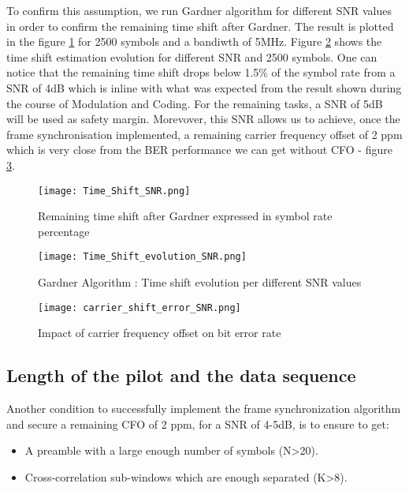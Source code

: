 To confirm this assumption, we run Gardner algorithm for different SNR values in order to confirm the remaining time shift after
Gardner.  The result is plotted in the figure \ref{Time_Shift_SNR} for 2500 symbols and a bandiwth of 5MHz.
Figure \ref{Time_Shift_evolution_SNR} shows the time shift estimation evolution for different SNR and 2500 symbols. 
 One can notice that the remaining time shift drops below 1.5\% of the symbol rate from a SNR of 4dB which is inline with what 
 was expected from the result shown during the course of Modulation and Coding.  For the remaining tasks, a SNR of 5dB will be 
 used as safety margin.
Morevover, this SNR allows us to achieve, once the frame synchronisation implemented, a remaining carrier frequency offset
of 2 ppm which is very close from the BER performance we can get without CFO - figure \ref{fig:carrier_shift_error_SNR}.

\begin{figure}[H]
    \centering
    \texttt{[image: Time\_Shift\_SNR.png]}
    \caption{Remaining time shift after Gardner expressed in symbol rate percentage}
    \label{Time_Shift_SNR}
\end{figure}

\begin{figure}[H]
    \centering
    \texttt{[image: Time\_Shift\_evolution\_SNR.png]}
    \caption{Gardner Algorithm : Time shift evolution per different SNR values}
    \label{Time_Shift_evolution_SNR}
\end{figure}


\begin{figure}[H]
    \centering
    \texttt{[image: carrier\_shift\_error\_SNR.png]}
    \caption{Impact of carrier frequency offset on bit error rate}
    \label{fig:carrier_shift_error_SNR}
\end{figure}

\subsection{Length of the pilot and the data sequence}

Another condition to successfully implement the frame synchronization algorithm and secure a remaining 
CFO of 2 ppm, for a SNR of 4-5dB, is to ensure to get:
\begin{itemize}
    \item A preamble with a large enough number of symbols (N>20).
    \item Cross-correlation sub-windows which are enough separated (K>8).  
\end{itemize}

